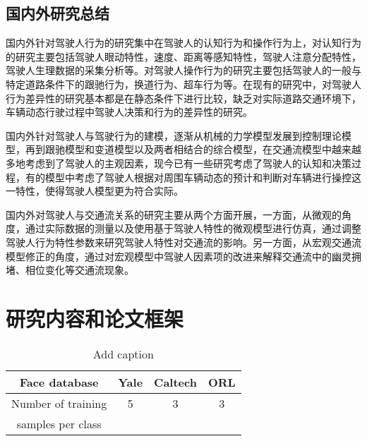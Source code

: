 \subsection{国内外研究总结}

国内外针对驾驶人行为的研究集中在驾驶人的认知行为和操作行为上，对认知行为的研究主要包括驾驶人眼动特性，速度、距离等感知特性，驾驶人注意分配特性，驾驶人生理数据的采集分析等。对驾驶人操作行为的研究主要包括驾驶人的一般与特定道路条件下的跟驰行为，换道行为、超车行为等。在现有的研究中，对驾驶人行为差异性的研究基本都是在静态条件下进行比较，缺乏对实际道路交通环境下，车辆动态行驶过程中驾驶人决策和行为的差异性的研究。

国内外针对驾驶人与驾驶行为的建模，逐渐从机械的力学模型发展到控制理论模型，再到跟驰模型和变道模型以及两者相结合的综合模型，在交通流模型中越来越多地考虑到了驾驶人的主观因素，现今已有一些研究考虑了驾驶人的认知和决策过程，有的模型中考虑了驾驶人根据对周围车辆动态的预计和判断对车辆进行操控这一特性，使得驾驶人模型更为符合实际。

国内外对驾驶人与交通流关系的研究主要从两个方面开展，一方面，从微观的角度，通过实际数据的测量以及使用基于驾驶人特性的微观模型进行仿真，通过调整驾驶人行为特性参数来研究驾驶人特性对交通流的影响。另一方面，从宏观交通流模型修正的角度，通过对宏观模型中驾驶人因素项的改进来解释交通流中的幽灵拥堵、相位变化等交通流现象。%

\section{研究内容和论文框架}


\begin{table}[htbp]
 \centering
 \caption{Add caption}
 \begin{tabular}{cccc}
   \addlinespace
    \toprule
    Face database & Yale  & Caltech & ORL \\
    \midrule
    Number of training & \multicolumn{ 1}{c}{5} & \multicolumn{ 1}{c}{3} & \multicolumn{ 1}{c}{3} \\
    samples per class  & \multicolumn{ 1}{c}{} & \multicolumn{ 1}{c}{} & \multicolumn{ 1}{c}{} \\
    \bottomrule
    \end{tabular}
  \label{tab:addlabel}
\end{table}
